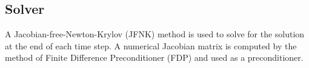 \documentclass[preprint,10pt]{elsarticle}
\begin{document}
\subsection{Solver} \label{sec:solver}
%
A Jacobian-free-Newton-Krylov (JFNK) method is used to solve for the solution at the end of each time step. A numerical Jacobian matrix is computed by the method of Finite Difference Preconditioner (FDP) and used as a preconditioner.
%
\end{document}
